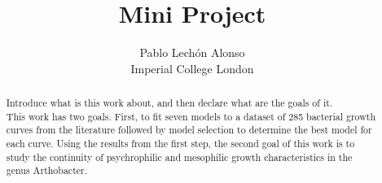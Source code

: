 \documentclass[titlepage,11pt]{article}
\begin{document}
\title{Mini Project}
\author{Pablo Lechón Alonso \\ 
			Imperial College London}
\date{}%

\maketitle

\begin{abstract}
	Introduce what is this work about, and then declare what are the goals of it.\\
	This work has two goals. First, to fit seven models to a dataset of 285 bacterial growth curves from the literature \cite{Bae2014, Bernhardt2018, Galarz2016, Gill1991, Phillips1987, ROTH1962, DaSilva2018, Sivonen1990, Stannard1985, Zwietering1994} followed by model selection to determine the best model for each curve. Using the results from the first step, the second goal of this work is to study the continuity of psychrophilic and mesophilic growth characteristics in the genus Arthobacter.\\
\end{abstract}
\end{document}
